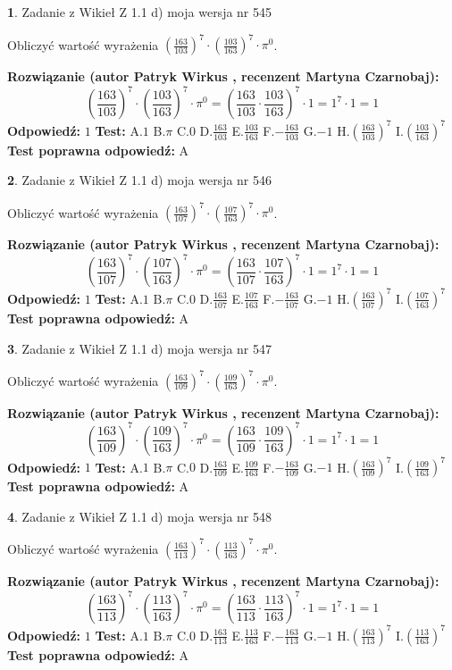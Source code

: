 \documentclass[12pt, a4paper]{article}
\theoremstyle{definition} %
\newtheorem{zad}{}
\newcommand{\zadStart}[1]{\begin{zad}#1\newline}
\newcommand{\zadStop}{\end{zad}}
\newcommand{\rozwStart}[2]{\noindent \textbf{Rozwiązanie (autor #1 , recenzent #2): }\newline}
\newcommand{\rozwStop}{\newline}
\newcommand{\odpStart}{\noindent \textbf{Odpowiedź:}\newline}
\newcommand{\odpStop}{\newline}
\newcommand{\testStart}{\noindent \textbf{Test:}\newline}
\newcommand{\testStop}{\newline}
\newcommand{\kluczStart}{\noindent \textbf{Test poprawna odpowiedź:}\newline}
\newcommand{\kluczStop}{\newline}
\begin{document}
\zadStart{Zadanie z Wikieł Z 1.1 d) moja wersja nr 545}

Obliczyć wartość wyrażenia $(\frac{163}{103})^{7} \cdot (\frac{103}{163})^{7} \cdot \pi^{0}$.
\zadStop
\rozwStart{Patryk Wirkus}{Martyna Czarnobaj}
$$(\frac{163}{103})^{7} \cdot (\frac{103}{163})^{7} \cdot \pi^{0} = (\frac{163}{103} \cdot \frac{103}{163})^{7} \cdot 1 = 1^{7} \cdot 1 = 1$$
\rozwStop
\odpStart
$1$
\odpStop
\testStart
A.$1$ B.$\pi$ C.$0$ D.$\frac{163}{103}$ E.$\frac{103}{163}$
F.$-\frac{163}{103}$ G.$-1$
H.$(\frac{163}{103})^{7}$
I.$(\frac{103}{163})^{7}$
\testStop
\kluczStart
A
\kluczStop



\zadStart{Zadanie z Wikieł Z 1.1 d) moja wersja nr 546}

Obliczyć wartość wyrażenia $(\frac{163}{107})^{7} \cdot (\frac{107}{163})^{7} \cdot \pi^{0}$.
\zadStop
\rozwStart{Patryk Wirkus}{Martyna Czarnobaj}
$$(\frac{163}{107})^{7} \cdot (\frac{107}{163})^{7} \cdot \pi^{0} = (\frac{163}{107} \cdot \frac{107}{163})^{7} \cdot 1 = 1^{7} \cdot 1 = 1$$
\rozwStop
\odpStart
$1$
\odpStop
\testStart
A.$1$ B.$\pi$ C.$0$ D.$\frac{163}{107}$ E.$\frac{107}{163}$
F.$-\frac{163}{107}$ G.$-1$
H.$(\frac{163}{107})^{7}$
I.$(\frac{107}{163})^{7}$
\testStop
\kluczStart
A
\kluczStop



\zadStart{Zadanie z Wikieł Z 1.1 d) moja wersja nr 547}

Obliczyć wartość wyrażenia $(\frac{163}{109})^{7} \cdot (\frac{109}{163})^{7} \cdot \pi^{0}$.
\zadStop
\rozwStart{Patryk Wirkus}{Martyna Czarnobaj}
$$(\frac{163}{109})^{7} \cdot (\frac{109}{163})^{7} \cdot \pi^{0} = (\frac{163}{109} \cdot \frac{109}{163})^{7} \cdot 1 = 1^{7} \cdot 1 = 1$$
\rozwStop
\odpStart
$1$
\odpStop
\testStart
A.$1$ B.$\pi$ C.$0$ D.$\frac{163}{109}$ E.$\frac{109}{163}$
F.$-\frac{163}{109}$ G.$-1$
H.$(\frac{163}{109})^{7}$
I.$(\frac{109}{163})^{7}$
\testStop
\kluczStart
A
\kluczStop



\zadStart{Zadanie z Wikieł Z 1.1 d) moja wersja nr 548}

Obliczyć wartość wyrażenia $(\frac{163}{113})^{7} \cdot (\frac{113}{163})^{7} \cdot \pi^{0}$.
\zadStop
\rozwStart{Patryk Wirkus}{Martyna Czarnobaj}
$$(\frac{163}{113})^{7} \cdot (\frac{113}{163})^{7} \cdot \pi^{0} = (\frac{163}{113} \cdot \frac{113}{163})^{7} \cdot 1 = 1^{7} \cdot 1 = 1$$
\rozwStop
\odpStart
$1$
\odpStop
\testStart
A.$1$ B.$\pi$ C.$0$ D.$\frac{163}{113}$ E.$\frac{113}{163}$
F.$-\frac{163}{113}$ G.$-1$
H.$(\frac{163}{113})^{7}$
I.$(\frac{113}{163})^{7}$
\testStop
\kluczStart
A
\kluczStop
\end{document}
